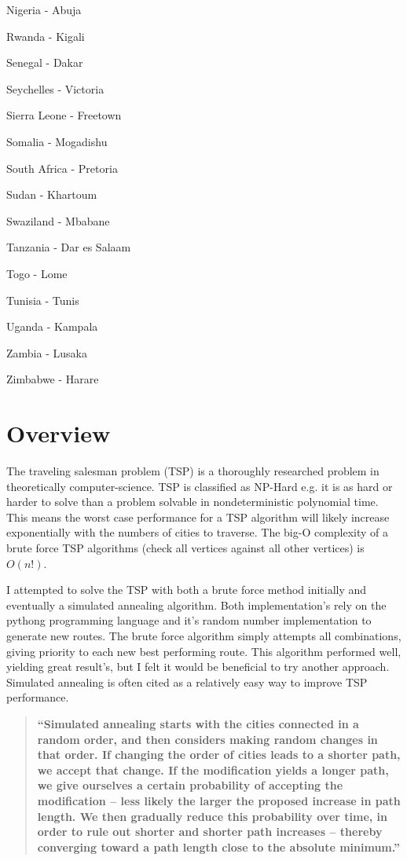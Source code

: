 \documentclass[12pt]{article}
\begin{document}
\begin{multicols}{3}
\begin{enumerate*}
\item Nigeria - Abuja
\item Rwanda - Kigali
\item Senegal - Dakar
\item Seychelles - Victoria
\item Sierra Leone - Freetown
\item Somalia - Mogadishu
\item South Africa - Pretoria
\item Sudan - Khartoum
\item Swaziland - Mbabane
\item Tanzania - Dar es Salaam
\item Togo - Lome
\item Tunisia - Tunis
\item Uganda - Kampala
\item Zambia - Lusaka
\item Zimbabwe - Harare
\end{enumerate*}
\end{multicols}

\section{Overview}

  The traveling salesman problem (TSP) is a thoroughly researched problem in theoretically computer-science. 
TSP is classified as NP-Hard e.g. it is as hard or harder to solve than a problem solvable in nondeterministic polynomial time.
This means the worst case performance for a TSP algorithm will likely increase exponentially with the numbers of cities to traverse.
The big-O complexity of a brute force TSP algorithms (check all vertices against all other vertices) is $O(n!)$.

  I attempted to solve the TSP with both a brute force method initially and eventually a simulated annealing algorithm. 
Both implementation's rely on the pythong programming language and it's random number implementation to generate new routes.
The brute force algorithm simply attempts all combinations, giving priority to each new best performing route.
This algorithm performed well, yielding great result's, but I felt it would be beneficial to try another approach. 
Simulated annealing is often cited as a relatively easy way to improve TSP performance.

\begin{quotation}\bf``\normalfont Simulated annealing starts with the cities connected in a random order, and then considers making random changes in that order. If changing the order of cities leads to a shorter path, we accept that change. If the modification yields a longer path, we give ourselves a certain probability of accepting the modification -- less likely the larger the proposed increase in path length. We then gradually reduce this probability over time, in order to rule out shorter and shorter path increases -- thereby converging toward a path length close to the absolute minimum.\bf''\normalfont\cite{sa} \end{quotation}
\end{document}
